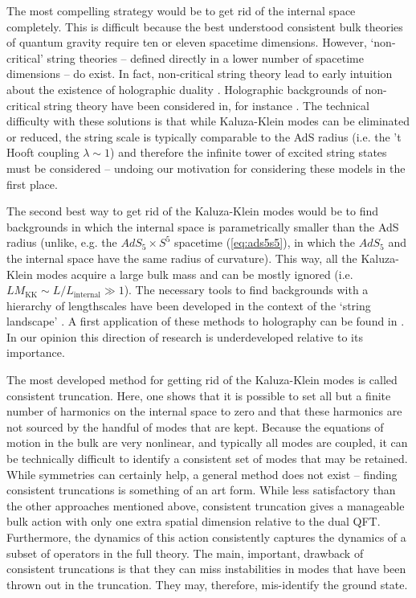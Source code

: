 \documentclass[10pt, oneside]{book}
\begin{document}
\begin{doublespace}
The most compelling strategy would be to get rid of the internal space completely. This is difficult because the best understood consistent bulk theories of quantum gravity require ten or eleven spacetime dimensions. However, `non-critical' string theories -- defined directly in a lower number of spacetime dimensions -- do exist. In fact, non-critical string theory lead to early intuition about the existence of holographic duality \cite{Polyakov:1998ju}. Holographic backgrounds of non-critical string theory have been considered in, for instance \cite{Kuperstein:2004yk, Klebanov:2004ya, Bigazzi:2005md}. The technical difficulty with these solutions is that while Kaluza-Klein modes can be eliminated or reduced, the string scale is typically comparable to the AdS radius (i.e. the 't Hooft coupling $\lambda \sim 1$) and therefore the infinite tower of excited string states must be considered -- undoing our motivation for considering these models in the first place.

The second best way to get rid of the Kaluza-Klein modes would be to find backgrounds in which the internal space is parametrically smaller than the AdS radius (unlike, e.g. the $AdS_5 \times S^5$ spacetime (\ref{eq:ads5s5}), in which the $AdS_5$ and the internal space have the same radius of curvature). This way, all the Kaluza-Klein modes acquire a large bulk mass and can be mostly ignored (i.e. $L M_\text{KK} \sim L/L_\text{internal} \gg 1$). The necessary tools to find backgrounds with a hierarchy of lengthscales have been developed in the context of the `string landscape' \cite{Denef:2007pq}. A first application of these methods to holography can be found in \cite{Polchinski:2009ch}. In our opinion this direction of research is underdeveloped relative to its importance.

The most developed method for getting rid of the Kaluza-Klein modes is called consistent truncation. Here, one shows that it is possible to set all but a finite number of harmonics on the internal space to zero and that these harmonics are not sourced by the handful of modes that are kept. Because the equations of motion in the bulk are very nonlinear, and typically all modes are coupled, it can be technically difficult to identify a consistent set of modes that may be retained. While symmetries can certainly help, a general method does not exist -- finding consistent truncations is something of an art form. While less satisfactory than the other approaches mentioned above, consistent truncation gives a manageable bulk action with only one extra spatial dimension relative to the dual QFT. Furthermore, the dynamics of this action consistently captures the dynamics of a subset of operators in the full theory. The main, important, drawback of consistent truncations is that they can miss instabilities in modes that have been thrown out in the truncation. They may, therefore, mis-identify the ground state.


\end{doublespace}
\end{document}
